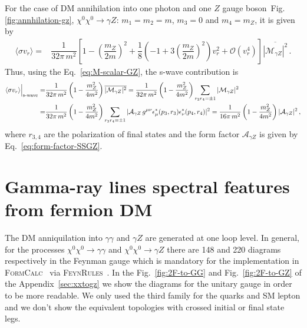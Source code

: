For the case of DM annihilation into one photon and one $Z$ gauge boson~Fig.\ref{fig:annhilation-gz}, $\chi^0\chi^0\rightarrow\gamma Z$: $m_1=m_2=m$, $m_3=0$ and $m_4=m_Z$, it is given by
%
\begin{align}
\langle\sigma v_r\rangle
= &  \dfrac{1}{32\pi\, m^2}\left[ 1- \left(\dfrac{m_Z}{2m}\right)^2 +\dfrac{1}{8}\left(-1+3\left(\dfrac{m_Z}{2m}\right)^2\right) v_r^2 + \mathcal{O}(v_r^4)\right]\overline{{|\mathcal{M}_{\gamma Z}|^2}} \,.
\end{align}
%
Thus,  using the Eq.~\eqref{eq:M-scalar-GZ}, the s-wave contribution is
\begin{align}
\langle\sigma v_r\rangle\Big{\vert}_{\text{s-wave}}
= & \dfrac{1}{32\pi\, m^2}\left( 1- \dfrac{m_Z^2}{4m^2} \right)\overline{{|\mathcal{M}_{\gamma Z}|^2}} 
=\dfrac{1}{32\pi\, m^2}\left( 1- \dfrac{m_Z^2}{4m^2} \right)\sum_{r_3r_4=\pm 1}{|\mathcal{M}_{\gamma Z}|^2}\nonumber \\
=&\dfrac{1}{32\pi\, m^2}\left( 1- \dfrac{m_Z^2}{4m^2} \right)\sum_{r_3r_4=\pm 1} |\mathcal{A}_{\gamma Z}\,g^{\mu\nu}\epsilon_{\mu}^*(p_3,r_3)\epsilon_{\nu}^*(p_4,r_4)|^2
=\dfrac{1}{16\pi\, m^2}\left( 1- \dfrac{m_Z^2}{4m^2} \right) |\mathcal{A}_{\gamma Z}|^2\,,
\end{align}
where $r_{3,4}$ are the polarization of final states and the form factor $\mathcal{A}_{\gamma Z}$ is given by Eq.~\ref{eq:form-factor-SSGZ}.
%








\section{Gamma-ray lines spectral features from fermion DM}

The DM anniquilation into $\gamma\gamma$ and $\gamma Z$ are generated at one loop level. In general, for the processes $\chi^0\chi^0\to\gamma\gamma$ and $\chi^0\chi^0\to\gamma Z$ there are 148 and 220 diagrams respectively in the Feynman gauge which is mandatory for the implementation in \textsc{FormCalc}~\cite{Hahn:1998yk} via \textsc{FeynRules}~\cite{Christensen:2008py}. In the Fig.~\ref{fig:2F-to-GG} and Fig.~\ref{fig:2F-to-GZ} of the Appendix~\ref{sec:xxtogz} we show the diagrams for the unitary gauge in order to be more readable.  We only used the third family for the quarks and SM lepton and  we don't show the equivalent topologies with crossed initial or final state legs.


